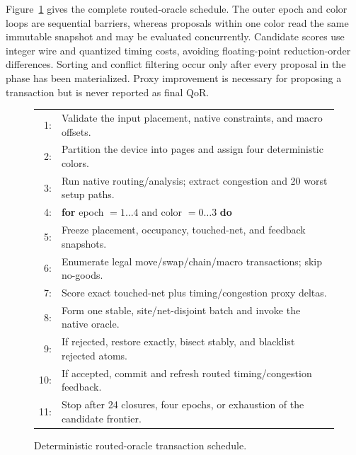 \documentclass[sigconf,anonymous,review]{acmart}
\begin{document}
Figure~\ref{fig:algorithm} gives the complete routed-oracle schedule.  The outer
epoch and color loops are sequential barriers, whereas proposals within one
color read the same immutable snapshot and may be evaluated concurrently.
Candidate scores use integer wire and quantized timing costs, avoiding
floating-point reduction-order differences.  Sorting and conflict filtering
occur only after every proposal in the phase has been materialized.  Proxy
improvement is necessary for proposing a transaction but is never reported as
final QoR.

\begin{figure}[t]
\centering
\begin{minipage}{0.96\columnwidth}
\small
\begin{tabular}{@{}rp{}@{}}
1: & Validate the input placement, native constraints, and macro offsets.\\
2: & Partition the device into pages and assign four deterministic colors.\\
3: & Run native routing/analysis; extract congestion and 20 worst setup paths.\\
4: & \textbf{for} epoch $=1\ldots4$ and color $=0\ldots3$ \textbf{do}\\
5: & \quad Freeze placement, occupancy, touched-net, and feedback snapshots.\\
6: & \quad Enumerate legal move/swap/chain/macro transactions; skip no-goods.\\
7: & \quad Score exact touched-net plus timing/congestion proxy deltas.\\
8: & \quad Form one stable, site/net-disjoint batch and invoke the native oracle.\\
9: & \quad If rejected, restore exactly, bisect stably, and blacklist rejected atoms.\\
10: & \quad If accepted, commit and refresh routed timing/congestion feedback.\\
11: & Stop after 24 closures, four epochs, or exhaustion of the candidate frontier.\\
\end{tabular}
\end{minipage}
\caption{Deterministic routed-oracle transaction schedule.}
\label{fig:algorithm}
\end{figure}
\end{document}
